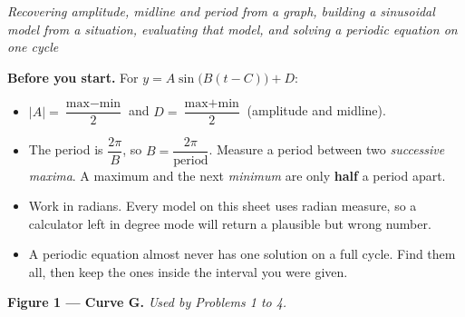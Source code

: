 \documentclass[12pt]{article}
\begin{document}

\begin{center}
\textit{Recovering amplitude, midline and period from a graph, building a
sinusoidal model from a situation, evaluating that model, and solving a
periodic equation on one cycle}
\end{center}

\noindent\textbf{Before you start.} For $y = A\sin\big(B(t - C)\big) + D$:
\begin{itemize}[leftmargin=1.2cm, itemsep=2pt, topsep=2pt]
\item $|A| = \dfrac{\text{max} - \text{min}}{2}$ \quad and \quad
$D = \dfrac{\text{max} + \text{min}}{2}$ \quad (amplitude and midline).
\item The period is $\dfrac{2\pi}{B}$, so $B = \dfrac{2\pi}{\text{period}}$.
Measure a period between two \emph{successive maxima}. A maximum and the next
\emph{minimum} are only \textbf{half} a period apart.
\item Work in radians. Every model on this sheet uses radian measure, so a
calculator left in degree mode will return a plausible but wrong number.
\item A periodic equation almost never has one solution on a full cycle. Find
them all, then keep the ones inside the interval you were given.
\end{itemize}

\bigskip
\noindent\textbf{Figure 1 --- Curve G.} \textit{Used by Problems 1 to 4.}

\begin{center}
\end{center}

\bigskip

\end{document}
